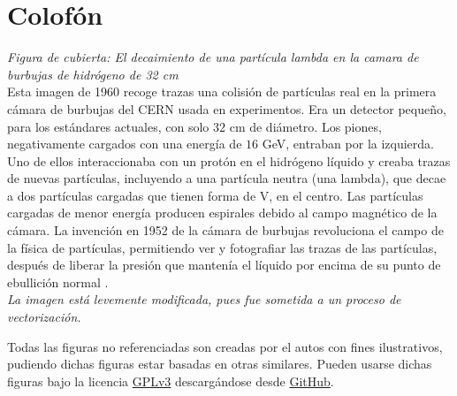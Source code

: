 \pagestyle{empty}

\hfill

\vfill


\section*{Colofón}


\textit{Figura de cubierta: El decaimiento de una partícula lambda en la camara de burbujas de hidrógeno de 32 cm} \\
Esta imagen de 1960  recoge trazas una colisión de partículas real en la primera cámara de burbujas del CERN usada en experimentos. Era un detector pequeño, para los estándares actuales, con solo $32$ cm de diámetro. Los piones, negativamente cargados con una energía de $16$ GeV, entraban por la izquierda. 
Uno de ellos interaccionaba con un protón en el hidrógeno líquido y creaba trazas de nuevas partículas, incluyendo a una partícula neutra (una lambda), que decae a dos partículas cargadas que tienen forma de V, en el centro. Las partículas cargadas de menor energía producen espirales debido al campo magnético de la cámara.
La invención en 1952 de la cámara de burbujas revoluciona el campo de la física de partículas, permitiendo ver y fotografiar las trazas de las partículas, después de liberar la presión que mantenía el líquido por encima de su punto de ebullición normal \cite{CERN-EX-11465}.\\
\textit{La imagen está levemente modificada, pues fue sometida a un proceso de vectorización.}

\bigskip

\noindent Todas las figuras no referenciadas son creadas por el autos con fines ilustrativos, pudiendo dichas figuras estar basadas en otras similares. Pueden usarse dichas figuras bajo la licencia \href{https://www.gnu.org/licenses/gpl.html}{GPLv3}  descargándose desde \href{https://github.com/marromlam/thesis-pictures.git}{GitHub}.


\bigskip

\noindent\begin{minipage}{0.75\textwidth}
\noindent\finalVersionString
\end{minipage}
\normalsize